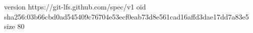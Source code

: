 version https://git-lfs.github.com/spec/v1
oid sha256:03b66cbd0ad545409c76704e53ecf0eab73d8e561cad16affd3dae17dd7a83e5
size 80
